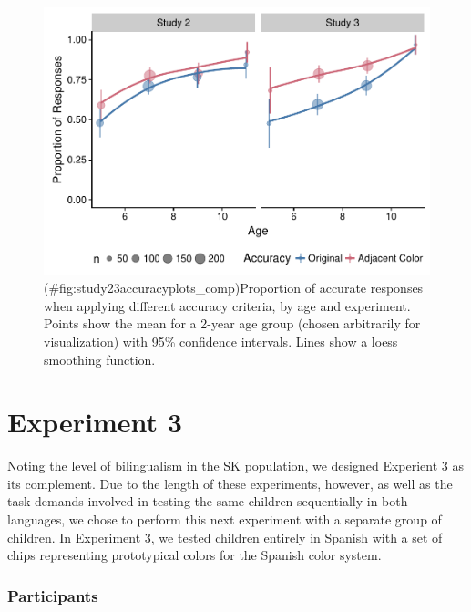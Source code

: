 \documentclass[,man,floatsintext]{apa6}
\theoremstyle{definition}
\theoremstyle{definition}
\theoremstyle{definition}
\theoremstyle{remark}
\begin{document}
\begin{figure}
\centering
\includegraphics{amazon_color_files/figure-latex/study23accuracyplots_comp-1.pdf}
\caption{(\#fig:study23accuracyplots\_comp)Proportion of accurate
responses when applying different accuracy criteria, by age and
experiment. Points show the mean for a 2-year age group (chosen
arbitrarily for visualization) with 95\% confidence intervals. Lines
show a loess smoothing function.}
\end{figure}

\section{Experiment 3}\label{experiment-3}

Noting the level of bilingualism in the SK population, we designed
Experient 3 as its complement. Due to the length of these experiments,
however, as well as the task demands involved in testing the same
children sequentially in both languages, we chose to perform this next
experiment with a separate group of children. In Experiment 3, we tested
children entirely in Spanish with a set of chips representing
prototypical colors for the Spanish color system.

\subsubsection{Participants}\label{participants-2}
\end{document}
